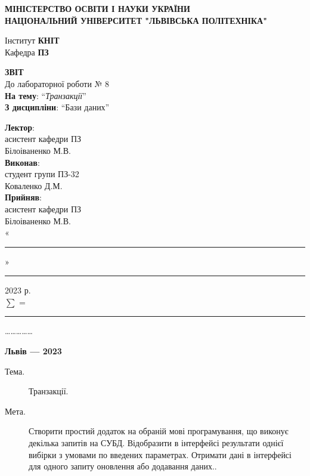 \documentclass[14pt]{extreport}
\newcommand\subject{Бази даних}
\newcommand\lecturer{асистент кафедри ПЗ\\Білоіваненко М.В.}
\newcommand\teacher{асистент кафедри ПЗ\\Білоіваненко М.В.}
\newcommand\mygroup{ПЗ-32}
\newcommand\lab{8}
\newcommand\theme{Транзакції}
\newcommand\purpose{Створити простий додаток на обраній мові програмування, що виконує декілька запитів на СУБД. Відобразити в інтерфейсі результати однієї вибірки з умовами по введених параметрах. Отримати дані в інтерфейсі для одного запиту оновлення або додавання даних.}
\begin{document}
\begin{normalsize}
	\begin{titlepage}
		\thispagestyle{empty}
		\begin{center}
			\textbf{МІНІСТЕРСТВО ОСВІТИ І НАУКИ УКРАЇНИ\\
				НАЦІОНАЛЬНИЙ УНІВЕРСИТЕТ "ЛЬВІВСЬКА ПОЛІТЕХНІКА"}
		\end{center}
		\begin{flushright}
			Інститут \textbf{КНІТ}\\
			Кафедра \textbf{ПЗ}
		\end{flushright}
		\vspace{200pt}
		\begin{center}
			\textbf{ЗВІТ}\\
			\vspace{10pt}
			До лабораторної роботи № \lab\\
			\textbf{На тему}: “\textit{\theme}”\\
			\textbf{З дисципліни}: “\subject”
		\end{center}
		\vspace{40pt}
		\begin{flushright}
			
			\textbf{Лектор}:\\
			\lecturer\\
			\vspace{10pt}
			\textbf{Виконав}:\\
			
			студент групи \mygroup\\
			Коваленко Д.М.\\
			\vspace{10pt}
			\textbf{Прийняв}:\\
			
			\teacher\\
			
			\vspace{28pt}
			«\rule{1cm}{0.15mm}» \rule{1.5cm}{0.15mm} 2023 р.\\
			$\sum$ = \rule{1cm}{0.15mm}……………\\
			
		\end{flushright}
		\vspace{\fill}
		\begin{center}
			\textbf{Львів — 2023}
		\end{center}
	\end{titlepage}
		
	\begin{description}
		\item[Тема.] \theme.
		\item[Мета.] \purpose.
	\end{description}


\end{normalsize}
\end{document}

